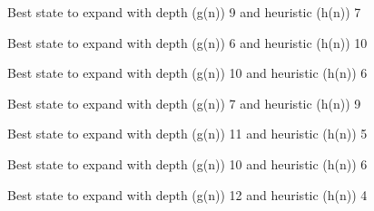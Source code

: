 \documentclass{article}
\begin{document}
{\noindent Best state to expand with depth (g(n)) 9 and heuristic (h(n)) 7\newline}
{}\newline

{\noindent Best state to expand with depth (g(n)) 6 and heuristic (h(n)) 10\newline}
{}\newline

{\noindent Best state to expand with depth (g(n)) 10 and heuristic (h(n)) 6\newline}
{}\newline

{\noindent Best state to expand with depth (g(n)) 7 and heuristic (h(n)) 9\newline}
{}\newline

{\noindent Best state to expand with depth (g(n)) 11 and heuristic (h(n)) 5\newline}
{}\newline

{\noindent Best state to expand with depth (g(n)) 10 and heuristic (h(n)) 6\newline}
{}\newline

{\noindent Best state to expand with depth (g(n)) 12 and heuristic (h(n)) 4\newline}
{}\newline
\end{document}

